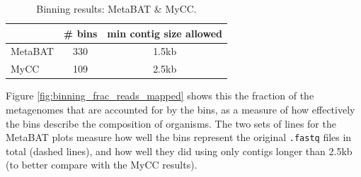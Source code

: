 \begin{table}[H]
\centering
\begin{singlespace}
\caption[Binning results: MetaBAT \& MyCC]
	{Binning results: MetaBAT \& MyCC.}
\label{table:sample_read_sizes}
\begin{tabular}{l | cc}
            & \# bins &  min contig size allowed \\  %
\midrule
	MetaBAT & 330   & 1.5kb \\
	MyCC    & 109   & 2.5kb \\


\end{tabular}
\end{singlespace}
\end{table}

Figure \ref{fig:binning_frac_reads_mapped} shows this the fraction of the metagenomes that are accounted for by the bins, as a measure of how effectively the bins describe the composition of organisms.
The two sets of lines for the MetaBAT plots measure how well the bins represent the original \texttt{.fastq} files in total (dashed lines), and how well they did using only contigs longer than 2.5kb (to better compare with the MyCC results).

